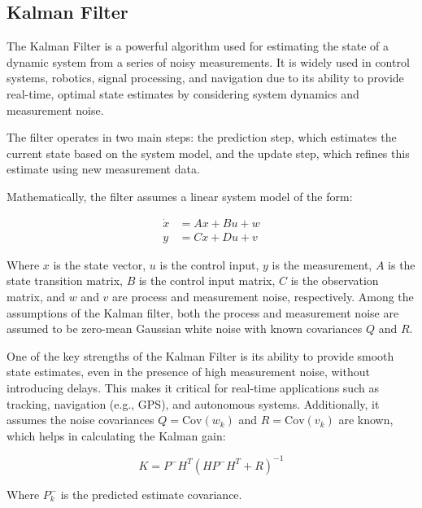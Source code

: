 \subsection{Kalman Filter}
\label{sec:kalman_filter}

The Kalman Filter is a powerful algorithm used for estimating the state of a dynamic system from a series of noisy measurements.
It is widely used in control systems, robotics, signal processing, and navigation due to its ability to provide real-time, optimal state estimates by considering system dynamics and measurement noise.

The filter operates in two main steps: the prediction step, which estimates the current state based on the system model, and the update step, which refines this estimate using new measurement data.


Mathematically, the filter assumes a linear system model of the form:

\begin{equation}
    \begin{aligned}
        \dot{x} & = A x + B u + w \\
        y       & = C x + D u + v
    \end{aligned}
\end{equation}

Where $x$ is the state vector, $u$ is the control input, $y$ is the measurement, $A$ is the state transition matrix, $B$ is the control input matrix, $C$ is the observation matrix, and $w$ and $v$ are process and measurement noise, respectively.
Among the assumptions of the Kalman filter, both the process and measurement noise are assumed to be zero-mean Gaussian white noise with known covariances $Q$ and $R$.

One of the key strengths of the Kalman Filter is its ability to provide smooth state estimates, even in the presence of high measurement noise, without introducing delays.
This makes it critical for real-time applications such as tracking, navigation (e.g., GPS), and autonomous systems.
Additionally, it assumes the noise covariances $Q = \text{Cov}(w_k)$ and $R = \text{Cov}(v_k)$ are known, which helps in calculating the Kalman gain:

\begin{equation}
    K = P^- H^T (H P^- H^T + R)^{-1}
    \label{eq:kalman_gain}
\end{equation}

Where $P_k^-$ is the predicted estimate covariance.

